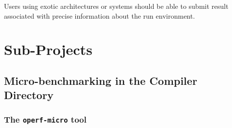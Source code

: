 \documentclass[11pt,a4paper]{article}
\begin{document}
Users using exotic architectures or systems should be able to submit
result associated with precise information about the run environment.

\section{Sub-Projects}

\subsection{Micro-benchmarking in the Compiler Directory}

\subsubsection{The {\tt operf-micro} tool}
\end{document}
